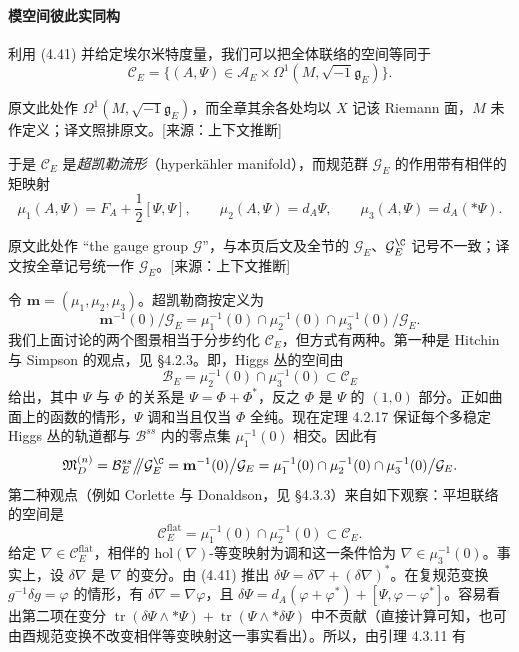 \paragraph{模空间彼此实同构} 利用 (4.41) 并给定埃尔米特度量，我们可以把全体联络的空间等同于
\[
\mathcal{C}_E=\bigl\{(A,\Psi)\in\mathcal{A}_E\times\Omega^1(M,\sqrt{-1}\mathfrak{g}_E)\bigr\}.
\]\begin{annote}原文此处作 $\Omega^1(M,\sqrt{-1}\mathfrak{g}_E)$，而全章其余各处均以 $X$ 记该 Riemann 面，$M$ 未作定义；译文照排原文。[来源：上下文推断]\end{annote}
于是 $\mathcal{C}_E$ 是\emph{超凯勒流形}（hyperkähler manifold），而规范群 $\mathcal{G}_E$ 的作用带有相伴的矩映射
\begin{equation}
\mu_1(A,\Psi)=F_A+\frac{1}{2}[\Psi,\Psi],\qquad \mu_2(A,\Psi)=d_A\Psi,\qquad \mu_3(A,\Psi)=d_A(*\Psi).
\label{eq:4.45}\tag{4.45}
\end{equation}\begin{annote}原文此处作 “the gauge group $\mathcal{G}$”，与本页后文及全节的 $\mathcal{G}_E$、$\mathcal{G}^{\C}_E$ 记号不一致；译文按全章记号统一作 $\mathcal{G}_E$。[来源：上下文推断]\end{annote}
令 $\mathbf{m}=(\mu_1,\mu_2,\mu_3)$。超凯勒商按定义为
\[
\mathbf{m}^{-1}(0)\big/\mathcal{G}_E=\mu_1^{-1}(0)\cap\mu_2^{-1}(0)\cap\mu_3^{-1}(0)\big/\mathcal{G}_E.
\]
我们上面讨论的两个图景相当于分步约化 $\mathcal{C}_E$，但方式有两种。第一种是 Hitchin 与 Simpson 的观点，见 §4.2.3。即，Higgs 丛的空间由
\[
\mathcal{B}_E=\mu_2^{-1}(0)\cap\mu_3^{-1}(0)\subset\mathcal{C}_E
\]
给出，其中 $\Psi$ 与 $\Phi$ 的关系是 $\Psi=\Phi+\Phi^*$，反之 $\Phi$ 是 $\Psi$ 的 $(1,0)$ 部分。正如曲面上的函数的情形，$\Psi$ 调和当且仅当 $\Phi$ 全纯。现在定理 4.2.17 保证每个多稳定 Higgs 丛的轨道都与 $\mathcal{B}^{ss}$ 内的零点集 $\mu_1^{-1}(0)$ 相交。因此有
\[
\mathfrak{M}^{(n)}_D=\mathcal{B}^{ss}_E\big/\!\!\big/\mathcal{G}^{\C}_E=\mathbf{m}^{-1}(0)\big/\mathcal{G}_E=\mu_1^{-1}(0)\cap\mu_2^{-1}(0)\cap\mu_3^{-1}(0)\big/\mathcal{G}_E.
\]
第二种观点（例如 Corlette 与 Donaldson，见 §4.3.3）来自如下观察：平坦联络的空间是
\[
\mathcal{C}^{\mathrm{flat}}_E=\mu_1^{-1}(0)\cap\mu_2^{-1}(0)\subset\mathcal{C}_E.
\]
给定 $\nabla\in\mathcal{C}^{\mathrm{flat}}_E$，相伴的 $\mathrm{hol}(\nabla)$-等变映射为调和这一条件恰为 $\nabla\in\mu_3^{-1}(0)$。事实上，设 $\delta\nabla$ 是 $\nabla$ 的变分。由 (4.41) 推出 $\delta\Psi=\delta\nabla+(\delta\nabla)^*$。在复规范变换 $g^{-1}\delta g=\varphi$ 的情形，有 $\delta\nabla=\nabla\varphi$，且 $\delta\Psi=d_A(\varphi+\varphi^*)+[\Psi,\varphi-\varphi^*]$。容易看出第二项在变分 $\operatorname{tr}(\delta\Psi\wedge*\Psi)+\operatorname{tr}(\Psi\wedge*\delta\Psi)$ 中不贡献（直接计算可知，也可由酉规范变换不改变相伴等变映射这一事实看出）。所以，由引理 4.3.11 有

